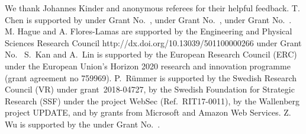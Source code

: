 \documentclass[acmsmall,screen]{acmart}\settopmatter{}
\begin{document}
\begin{acks}
We thank Johannes Kinder and anonymous referees for their helpful feedback.
%
T. Chen is supported by  under Grant No.~,   under Grant No.~,  under Grant No.~.
    M. Hague and A. Flores-Lamas are supported by the
                 {Engineering and Physical Sciences Research Council}
                 {http://dx.doi.org/10.13039/501100000266}
    under Grant No.~
    S.~Kan and A.~Lin is supported by the European Research Council (ERC) 
    under the European
    Union's Horizon 2020 research and innovation programme (grant agreement no
    759969).
    P.\ R\"ummer is supported by the Swedish Research Council (VR)
    under grant~2018-04727, by the Swedish Foundation for Strategic
    Research (SSF) under the project WebSec (Ref.\ RIT17-0011), by the
    Wallenberg project UPDATE, and by grants from Microsoft and Amazon
    Web Services.
    Z. Wu is supported by the
    under Grant No.~.
\end{acks}

\newpage

%


%
%
%
%
\end{document}
